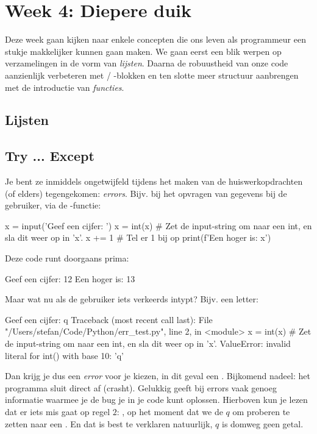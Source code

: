 \chapter{Week 4: Diepere duik}
Deze week gaan kijken naar enkele concepten die ons leven als programmeur een stukje makkelijker kunnen gaan maken. We gaan eerst een blik werpen op verzamelingen in de vorm van \textit{lijsten}. Daarna de robuustheid van onze code aanzienlijk verbeteren met  / -blokken en ten slotte meer structuur aanbrengen met de introductie van \textit{functies}. 

\section{Lijsten}




\section{Try ... Except}
Je bent ze inmiddels ongetwijfeld tijdens het maken van de huiswerkopdrachten (of elders) tegengekomen: \textit{errors}. Bijv. bij het opvragen van gegevens bij de gebruiker, via de -functie:
\begin{python}
x = input('Geef een cijfer: ')
x = int(x)  # Zet de input-string om naar een int, en sla dit weer op in 'x'.
x += 1  # Tel er 1 bij op
print(f'Een hoger is: {x}')
\end{python}
Deze code runt doorgaans prima:
\begin{python}
Geef een cijfer: 12
Een hoger is: 13
\end{python}
Maar wat nu als de gebruiker iets verkeerds intypt? Bijv. een letter:
\begin{python}
Geef een cijfer: q
Traceback (most recent call last):
  File "/Users/stefan/Code/Python/err_test.py", line 2, in <module>
    x = int(x)  # Zet de input-string om naar een int, en sla dit weer op in 'x'.
ValueError: invalid literal for int() with base 10: 'q'
\end{python}
Dan krijg je dus een \textit{error} voor je kiezen, in dit geval een . Bijkomend nadeel: het programma sluit direct af (crasht). Gelukkig geeft  bij errors vaak genoeg informatie waarmee je de bug je in je code kunt oplossen. Hierboven kun je lezen dat er iets mis gaat op regel $2$: , op het moment dat we de  $q$ om proberen te zetten naar een . En dat is best te verklaren natuurlijk, $q$ is domweg geen getal. 

